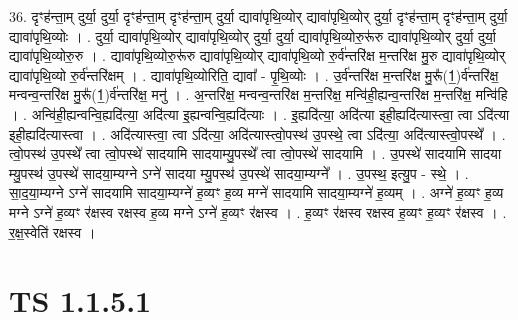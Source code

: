 \documentclass[17pt]{extarticle}
\begin{document}
36. दृꣳह॑न्ता॒म् दुर्या॒ दुर्या॒ दृꣳह॑न्ता॒म् दृꣳह॑न्ता॒म् दुर्या॒ द्यावा॑पृथि॒व्योर् द्यावा॑पृथि॒व्योर् दुर्या॒ दृꣳह॑न्ता॒म् दृꣳह॑न्ता॒म् दुर्या॒ द्यावा॑पृथि॒व्योः । . दुर्या॒ द्यावा॑पृथि॒व्योर् द्यावा॑पृथि॒व्योर् दुर्या॒ दुर्या॒ द्यावा॑पृथि॒व्योरु॒रू॑रु द्यावा॑पृथि॒व्योर् दुर्या॒ दुर्या॒ द्यावा॑पृथि॒व्योरु॒रु । . द्यावा॑पृथि॒व्योरु॒रू॑रु द्यावा॑पृथि॒व्योर् द्यावा॑पृथि॒व्यो रु॒र्व॑न्तरि॑क्ष म॒न्तरि॑क्ष मु॒रु द्यावा॑पृथि॒व्योर् द्यावा॑पृथि॒व्यो रु॒र्व॑न्तरि॑क्षम् । . द्यावा॑पृथि॒व्योरिति॒ द्यावा᳚ - पृ॒थि॒व्योः । . उ॒र्व॑न्तरि॑क्ष म॒न्तरि॑क्ष मु॒रू᳚(1॒)र्व॑न्तरि॑क्ष॒ मन्वन्व॒न्तरि॑क्ष मु॒रू᳚(1॒)र्व॑न्तरि॑क्ष॒ मनु॑ । . अ॒न्तरि॑क्ष॒ मन्वन्व॒न्तरि॑क्ष म॒न्तरि॑क्ष॒ मन्वि॑ही॒ह्यन्व॒न्तरि॑क्ष म॒न्तरि॑क्ष॒ मन्वि॑हि । . अन्वि॑ही॒ह्यन्वन्वि॒ह्यदि॑त्या॒ अदि॑त्या इ॒ह्यन्वन्वि॒ह्यदि॑त्याः । . इ॒ह्यदि॑त्या॒ अदि॑त्या इही॒ह्यदि॑त्यास्त्वा॒ त्वा ऽदि॑त्या इही॒ह्यदि॑त्यास्त्वा । . अदि॑त्यास्त्वा॒ त्वा ऽदि॑त्या॒ अदि॑त्यास्त्वो॒पस्थ॑ उ॒पस्थे॒ त्वा ऽदि॑त्या॒ अदि॑त्यास्त्वो॒पस्थे᳚ । . त्वो॒पस्थ॑ उ॒पस्थे᳚ त्वा त्वो॒पस्थे॑ सादयामि सादयाम्यु॒पस्थे᳚ त्वा त्वो॒पस्थे॑ सादयामि । . उ॒पस्थे॑ सादयामि सादया म्यु॒पस्थ॑ उ॒पस्थे॑ सादया॒म्यग्ने ऽग्ने॑ सादया म्यु॒पस्थ॑ उ॒पस्थे॑ सादया॒म्यग्ने᳚ । . उ॒पस्थ॒ इत्यु॒प - स्थे॒ । . सा॒द॒या॒म्यग्ने ऽग्ने॑ सादयामि सादया॒म्यग्ने॑ ह॒व्यꣳ ह॒व्य मग्ने॑ सादयामि सादया॒म्यग्ने॑ ह॒व्यम् । . अग्ने॑ ह॒व्यꣳ ह॒व्य मग्ने ऽग्ने॑ ह॒व्यꣳ र॑क्षस्व रक्षस्व ह॒व्य मग्ने ऽग्ने॑ ह॒व्यꣳ र॑क्षस्व । . ह॒व्यꣳ र॑क्षस्व रक्षस्व ह॒व्यꣳ ह॒व्यꣳ र॑क्षस्व । . र॒क्ष॒स्वेति॑ रक्षस्व । \newline
\pagebreak
{}

\section{ TS 1.1.5.1 }
\end{document}
